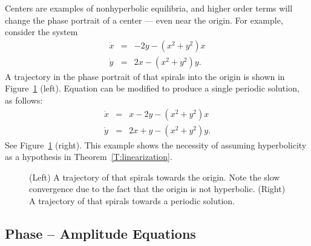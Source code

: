 \documentclass{ximera}
\begin{document}
Centers are examples of nonhyperbolic
equilibria, and higher
order terms will change the 
phase portrait of a center --- even
near the origin.  For example, consider the system  
\begin{equation*}  \label{e:nonlincenter}
\begin{array}{rcl}
\dot{x} & = & -2y -(x^2+y^2)x \\
\dot{y} & = & 2x - (x^2+y^2)y.
\end{array}
\end{equation*}
A trajectory in the phase portrait of  that
spirals into the origin is shown in Figure~\ref{F:nonlincenter}
(left). Equation  can be modified to produce
a single periodic solution, as follows:
\begin{equation*}  \label{e:nonlincenter2}
\begin{array}{rcl}
\dot{x} & = & x-2y -(x^2+y^2)x \\
\dot{y} & = & 2x+y - (x^2+y^2)y.
\end{array}
\end{equation*}
See Figure~\ref{F:nonlincenter} (right).  This example shows the necessity 
of assuming hyperbolicity as a hypothesis in Theorem~\ref{T:linearization}.  

\begin{figure}[htb]
           \centerline{%
	   }
           \caption{(Left) A trajectory of \protect{}
that spirals towards the origin. Note the slow convergence due to the fact 
that the origin is not hyperbolic.  (Right) A trajectory of 
\protect{} that spirals towards a periodic solution.}
           \label{F:nonlincenter}
\end{figure}

\subsection*{Phase -- Amplitude Equations}
\end{document}
